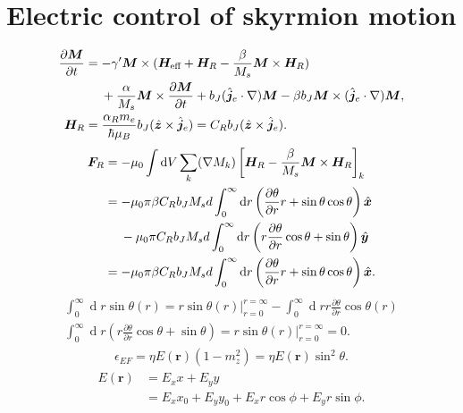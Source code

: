 \documentclass[12pt, a4paper, twoside, openright]{report}
\renewcommand{\d}[1]{\ensuremath{\operatorname{d}\!{#1}}}
\numberwithin{equation}{chapter}
\numberwithin{figure}{chapter}
\numberwithin{table}{chapter}
\begin{document}
\chapter{Electric control of skyrmion motion}
\begin{align}
\nonumber \frac{\partial \mathbold{M}}{\partial t} &= -\gamma'\mathbold{M}\times(\mathbold{H}_{\text{eff}}+\mathbold{H}_R-\frac{\beta}{M_s} \mathbold{M}\times\mathbold{H}_R) \\
&\hspace{4.5mm}+\frac{\alpha}{M_s}\mathbold{M}\times\frac{\partial\mathbold{M}}{\partial t} + b_J (\mathbold{\hat{j}}_e\cdot\mathbold{\nabla})\mathbold{M} - \beta b_J \mathbold{M}\times(\mathbold{\hat{j}}_e\cdot\mathbold{\nabla})\mathbold{M}, \\
\mathbold{H}_R &= \frac{\alpha_R m_e}{\hbar \mu_B}b_J (\mathbold{\hat{z}}\times\mathbold{\hat{j}}_e) = C_R b_J (\mathbold{\hat{z}}\times\mathbold{\hat{j}}_e).
\end{align}
\begin{align}
\mathbold{F}_R &= -\mu_0\int \d V\sum_k (\mathbold{\nabla}M_k)\left[\mathbold{H}_R - \frac{\beta}{M_s}\mathbold{M}\times\mathbold{H}_R\right]_k \\
&= -\mu_0 \pi\beta C_R b_J M_s d \int_0^{\infty} \d r \left(\frac{\partial \theta}{\partial r} r + \sin\theta\cos\theta \right) \mathbold{\hat{x}} \\
&\hspace{4.5mm}- \mu_0 \pi C_R b_J M_s d \int_0^{\infty} \d r \left(r\frac{\partial \theta}{\partial r}\cos\theta + \sin\theta\right) \mathbold{\hat{y}} \\
&= -\mu_0 \pi\beta C_R b_J M_s d \int_0^{\infty} \d r \left(\frac{\partial \theta}{\partial r} r + \sin\theta\cos\theta \right) \mathbold{\hat{x}}.
\end{align}
\begin{align}
\int_0^{\infty} \d r \sin\theta(r) = r\sin\theta(r)|_{r = 0}^{r=\infty} - \int_0^{\infty} \d r r \frac{\partial \theta}{\partial r} \cos\theta(r) \\
\int_0^{\infty} \d r \left(r\frac{\partial \theta}{\partial r}\cos\theta + \sin\theta\right) = r\sin\theta(r)|_{r = 0}^{r=\infty} = 0.
\end{align}
\begin{align}
\epsilon_{EF} = \eta E(\mathbold{r}) \left(1-m_z^2\right) = \eta E(\mathbold{r}) \sin^2\theta.
\end{align}
\begin{align}
E(\mathbold{r}) &= E_x x + E_y y \\
&= E_x x_0 + E_y y_0 + E_x r \cos\phi + E_y r \sin\phi.
\end{align}
\end{document}
